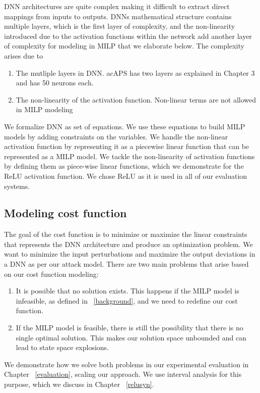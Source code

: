 DNN architectures are quite complex making it difficult to extract direct mappings from inputs to outputs. 
\ac{DNN}s  mathematical structure contains multiple layers, which is the first layer of complexity, and the non-linearity introduced due to the activation functions within the network add another layer of complexity for modeling in \ac{MILP}  that we elaborate below. 
The complexity arises due to 
\begin{enumerate}
	\item The mutliple layers in \ac{DNN}.
	ac{APS} has two layers as explained in Chapter 3 and has 50 neurons each. 
	\item The non-linearity  of the activation function. 
	Non-linear terms are not allowed in \ac{MILP} modeling \cite{gnonlinearity}
\end{enumerate}


We formalize \ac{DNN} as set of equations.
We use these equations to build \ac{MILP} models by adding constraints on the variables. 
We handle the non-linear activation function by representing it as a piecewise linear function that can be represented as a \ac{MILP} model. 
We tackle the non-linearity of activation functions by defining them as piece-wise linear functions, which we demonstrate for the ReLU activation function.
We chose ReLU as it is used in all of our evaluation systems. 

\subsection{Modeling cost function}
The goal of the cost function is to minimize or maximize the linear constraints that represents the \ac{DNN} architecture and produce an optimization problem. 
We want to minimize the input perturbations and maximize the output deviations in a \ac{DNN} as per our attack model. 
There are two main problems that arise based on our cost function modeling:
\begin{enumerate}
	\item It is possible that no solution exists. 
	This happens if the \ac{MILP} model is infeasible, as defined in ~\ref{background}, and we need to redefine our cost function. 
	\item If the \ac{MILP} model is feasible, there is still the possibility that there is no single optimal solution. 
	This makes our solution space unbounded and can lead to state space explosions. 
\end{enumerate}

We demonstrate how we solve both problems in our experimental evaluation in Chapter ~\ref{evaluation}, scaling our approach. 
We use interval analysis for this purpose, which we discuss in Chapter ~\ref{relusyn}. 


















